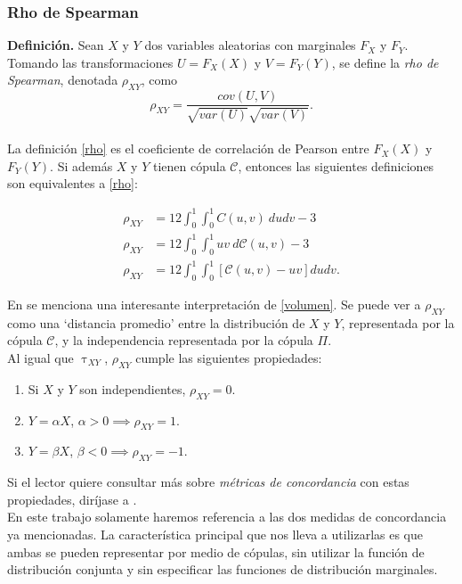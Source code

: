 \documentclass[11pt,a4paper]{article}
\newcommand{\C}{\mathcal{C}}
\begin{document}
\subsubsection{Rho de Spearman}

\textbf{Definición.} Sean $X$ y $Y$ dos variables aleatorias con marginales $F_X$ y $F_Y$. Tomando las transformaciones $U = F_X(X)$ y $V = F_Y(Y)$, se define la \textit{rho de Spearman}, denotada $\rho_{XY}$, como
\begin{equation} \label{rho}
\rho_{XY} = \frac{cov(U, V)}{\sqrt{var(U)}\sqrt{var(V)}}.
\end{equation}\\

La definición \eqref{rho} es el coeficiente de correlación de Pearson entre $F_X(X)$ y $F_Y(Y)$. Si además $X$ y $Y$ tienen cópula $\C$, entonces las siguientes definiciones son equivalentes a \eqref{rho}:

\begin{align}
\rho_{XY} &= 12\int_0^1 \int_0^1 C(u, v) \ dudv-3\\
\rho_{XY} &= 12\int_0^1 \int_0^1 uv \ d\C(u,v)-3\\
\rho_{XY} &= 12\int_0^1\int_0^1 \left[ \C(u, v) - uv \right] dudv \label{volumen}.
\end{align}

En \citet{nelsen} se menciona una interesante interpretación de \eqref{volumen}. Se puede ver a $\rho_{XY}$ como una `distancia promedio' entre la distribución de $X$ y $Y$, representada por la cópula $\C$, y la independencia representada por la cópula $\Pi$.\\

Al igual que $\uptau_{XY}$, $\rho_{XY}$ cumple las siguientes propiedades:

\begin{enumerate}
\item Si $X$ y $Y$ son independientes, $\rho_{XY} = 0$.
\item $Y = \alpha X$, $\alpha > 0 \implies \rho_{XY} = 1$.
\item $Y = \beta X$, $\beta < 0 \implies \rho_{XY} = -1$.
\end{enumerate}

Si el lector quiere consultar más sobre \textit{métricas de concordancia} con estas propiedades, diríjase a \citet{nelsen}.\\

En este trabajo solamente haremos referencia a las dos medidas de concordancia ya mencionadas. La característica principal que nos lleva a utilizarlas es que ambas se pueden representar por medio de cópulas, sin utilizar la función de distribución conjunta y sin especificar las funciones de distribución marginales.\\
\end{document}
